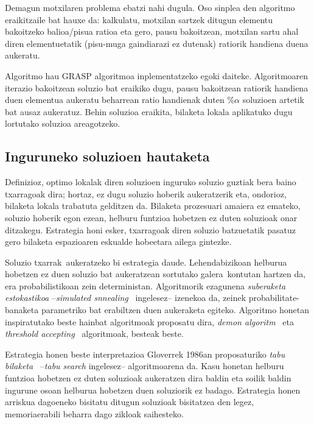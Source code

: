 \documentclass[eu]{ifirak}\usepackage[]{graphicx}\usepackage[]{color}
\newcommand{\zkk}{\guillemotleft}
\newcommand{\skk}{\guillemotright}
\begin{document}
\begin{tcolorbox}
\begin{ifexample}
Demagun motxilaren problema ebatzi nahi dugula. Oso sinplea den algoritmo eraikitzaile bat hauxe da: kalkulatu, motxilan sartzek ditugun elementu bakoitzeko balioa/pisua ratioa eta gero, pausu bakoitzean, motxilan sartu ahal diren elementuetatik (pisu-muga gaindiarazi ez dutenak) ratiorik handiena duena aukeratu. 

Algoritmo hau GRASP algoritmoa inplementatzeko egoki daiteke. Algoritmoaren iterazio bakoitzean soluzio bat eraikiko dugu, pausu bakoitzean ratiorik handiena duen elementua aukeratu beharrean ratio handienak duten $\%\alpha$ soluzioen artetik bat ausaz aukeratuz. Behin soluzioa eraikita, bilaketa lokala aplikatuko dugu lortutako soluzioa areagotzeko. 
\end{ifexample}
\end{tcolorbox}


\subsection{Inguruneko soluzioen hautaketa}

Definizioz, optimo lokalak diren soluzioen inguruko soluzio guztiak bera baino txarragoak dira; hortaz, ez dugu soluzio hoberik aukeratzerik eta, ondorioz, bilaketa lokala trabatuta gelditzen da. Bilaketa prozesuari amaiera ez emateko, soluzio hoberik egon ezean, helburu funtzioa hobetzen ez duten soluzioak onar ditzakegu. Estrategia honi esker, txarragoak diren soluzio batzuetatik pasatuz gero bilaketa espazioaren eskualde hobeetara ailega gintezke.

Soluzio \zkk txarrak\skk\ aukeratzeko bi estrategia daude. Lehendabizikoan helburua hobetzen ez duen soluzio bat aukeratzean sortutako \zkk galera\skk\ kontutan hartzen da, era probabilistikoan zein deterministan. Algoritmorik ezagunena \textit{suberaketa estokastikoa} --\textit{simulated snnealing}~\cite{kirkpatrick1983,cerny1985} ingelesez-- izenekoa da, zeinek probabilitate-banaketa parametriko bat erabiltzen duen aukeraketa egiteko. Algoritmo honetan inspiratutako beste hainbat algoritmoak proposatu dira, \textit{demon algoritm}~\cite{pepper2000} eta \textit{threshold accepting}~\cite{dueck1990,moscato1990} algoritmoak, besteak beste.

Estrategia honen beste interpretazioa Gloverrek 1986an proposaturiko \textit{tabu bilaketa}~\cite{glover1986} --\textit{tabu search} ingelesez-- algoritmoarena da. Kasu honetan helburu funtzioa hobetzen ez duten soluzioak aukeratzen dira baldin eta soilik baldin ingurune osoan helburua hobetzen duen soluziorik ez badago. Estrategia honen arriskua dagoeneko bisitatu ditugun soluzioak bisitatzea den legez, \zkk memoria\skk erabili beharra dago zikloak saihesteko.
\end{document}
